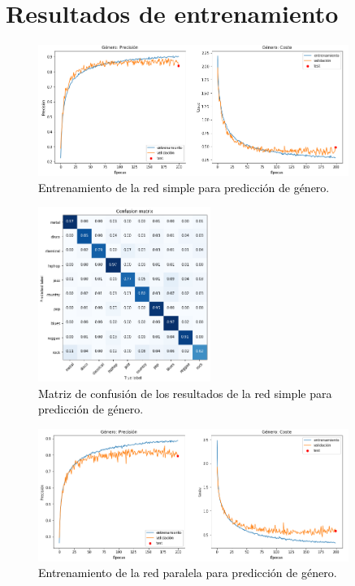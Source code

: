 \chapter{Resultados de entrenamiento}\label{Chapter:apendice_resultados}


\begin{figure}[!ht]
  \centering
  \includegraphics[width=0.9\textwidth]{Figures/entrenamiento_genero_simple.png}
  \caption{\textcolor{black}{Entrenamiento de la red simple para predicción de género}.}
  \label{Fig:entrenamiento_genero_simple}
\end{figure}

\begin{figure}[!ht]
  \centering
  \includegraphics[width=0.5\textwidth]{Figures/confusion_genero_simple.png}
  \caption{\textcolor{black}{Matriz de confusión de los resultados de la red simple para predicción de género}.}
  \label{Fig:confusion_genero_simple}
\end{figure}

\begin{figure}[!ht]
  \centering
  \includegraphics[width=0.9\textwidth]{Figures/entrenamiento_genero_split.png}
  \caption{\textcolor{black}{Entrenamiento de la red paralela para predicción de género}.}
  \label{Fig:entrenamiento_genero_split}
\end{figure}

